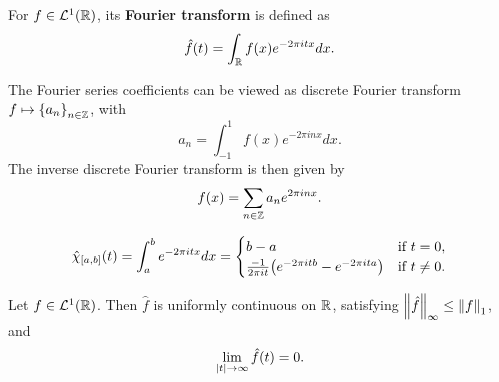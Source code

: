 \begin{definition}
    For $f\in\mathcal{L}^1(\mathbb{R})$, its \textbf{Fourier transform} is defined as 
    \begin{equation}
        \hat{f}(t) = \int_{\mathbb{R}} f(x)e^{-2\pi itx}dx.
    \end{equation}
\end{definition}
\begin{remark}
    The Fourier series coefficients can be viewed as discrete Fourier transform 
    $f\mapsto \left\{ {a_n} \right\}_{n\in\mathbb{Z}}$, with 
    \begin{equation}
        a_n = \int_{-1}^{1}f(x)e^{-2\pi inx}dx.
    \end{equation}
    The inverse discrete Fourier transform is then given by 
    \begin{equation}
        f(x) = \sum_{n\in\mathbb{Z}}a_ne^{2\pi inx}.
    \end{equation}
\end{remark}

\begin{example}
    \begin{equation*}
        \hat{\chi}_{[a,b]}(t) = \int_{a}^{b}e^{-2\pi itx}dx 
        = \begin{cases}
            b-a & \text{if }t=0, \\
            \frac{-1}{2\pi it}\pth{e^{-2\pi itb} - e^{-2\pi ita}} & \text{if }t\neq 0.
        \end{cases} 
    \end{equation*}    
\end{example} 

\begin{lemma}
    Let $f\in\mathcal{L}^1(\mathbb{R})$. Then $\hat{f}$ is uniformly continuous on $\mathbb{R}$, 
    satisfying $\left\lVert {\hat{f}} \right\rVert_\infty\leq\left\lVert {f} \right\rVert_1$, and 
    \begin{equation*}
        \lim_{\left\lvert {t} \right\rvert\to\infty}\hat{f}(t) = 0.
    \end{equation*} 
\end{lemma}